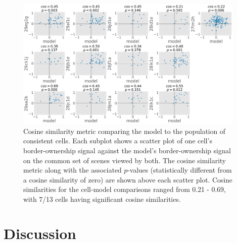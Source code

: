 \documentclass[12pt]{article}
\begin{document}
\begin{figure}[t]
\hfill
\begin{center}
\includegraphics[width=\textwidth]{figs/cell_model_cos_p}
\end{center}
\caption{
Cosine similarity metric comparing the model to the population of consistent cells. Each subplot shows a scatter plot of one cell's border-ownership signal against the model's border-ownership signal on the common set of scenes viewed by both. The cosine similarity metric along with the associated $p$-values (statistically different from a cosine similarity of zero) are shown above each scatter plot. Cosine similarities for the cell-model comparisons ranged from 0.21 - 0.69, with 7/13 cells having significant cosine similarities.}
\label{Fig:cell_model_cos}
\end{figure}

\section{Discussion}
\label{sec:discussion}


%
\end{document}
